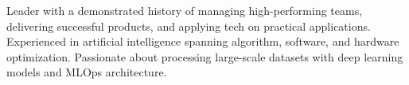 

\begin{cvparagraph}

	Leader with a demonstrated history of managing high-performing teams,
  delivering successful products, and applying tech on practical applications.
	Experienced in artificial intelligence spanning algorithm, software, and hardware optimization.
	Passionate about processing large-scale datasets with deep learning models and MLOps architecture.
\end{cvparagraph}
